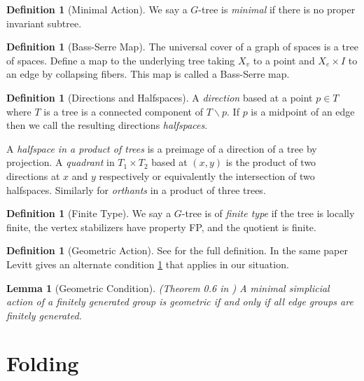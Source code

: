 \documentclass[12pt,parskip=full]{report}
\theoremstyle{plain}
\newtheorem{lem}[thm]{Lemma}
\theoremstyle{definition}
\newtheorem{dfn}[thm]{Definition}
\begin{document}
\begin{dfn}
    [Minimal Action]
    \label{defn:minimal}
    We say a $G$-tree is \emph{minimal} if there is no proper invariant subtree.
\end{dfn}

\begin{dfn}
    [Bass-Serre Map]
    \label{defn:bsmap}
    The universal cover of a graph of spaces is a tree of spaces. Define a map to the underlying tree taking $X_v$ to a point and $X_e \times I$ to an edge by collapsing fibers. This map is called a Bass-Serre map.
\end{dfn}


\begin{dfn}
    [Directions and Halfspaces]
    \label{dfn:directionhalfspaces}
    A \emph{direction} based at a point \(p\in T\) where \(T\) is a tree is a connected component of \(T\smallsetminus p\). If \(p\) is a midpoint of an edge then we call the resulting directions \emph{halfspaces}.
    
    A \emph{halfspace in a product of trees} is a preimage of a direction of a tree by projection. A \emph{quadrant} in \(T_1\times T_2\) based at \((x,y)\) is the product of two directions at \(x\) and \(y\) respectively or equivalently the intersection of two halfspaces. Similarly for \emph{orthants} in a product of three trees.
\end{dfn}

\begin{dfn}
    [Finite Type]
    \label{defn:finitetype} 
    We say a $G$-tree is of \emph{finite type} if the tree is locally finite, the vertex stabilizers have property FP, and the quotient is finite.
\end{dfn}


 \begin{dfn}
     [Geometric Action]
     \label{defn:geometricaction}
     See \cite{levitt} for the full definition. In the same paper Levitt gives an alternate condition \ref{lem:simpgeo} that applies in our situation.
 \end{dfn}
 
\begin{lem}
    [Geometric Condition]
    \label{lem:simpgeo} 
    (Theorem 0.6 in \cite{levitt})
    A minimal simplicial action of a finitely generated group is geometric if and only if all edge groups are finitely generated.
\end{lem}

\section{Folding} 
\end{document}
